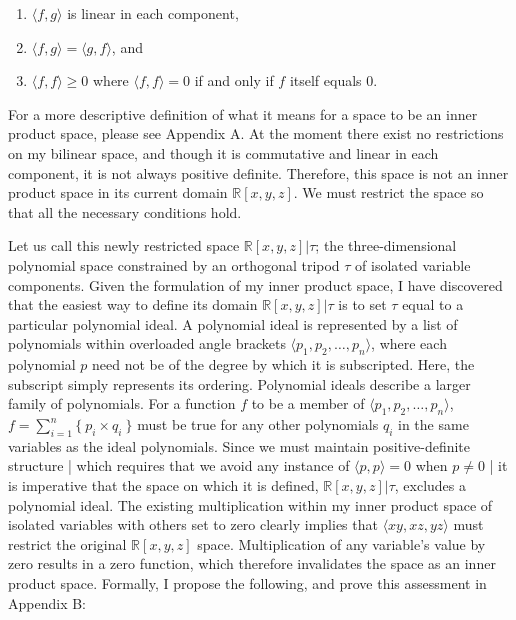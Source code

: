 \documentclass[letterpaper, 12pt]{article}
\begin{document}
\vspace*{2mm}
\begin{enumerate}
	\singlespacing
	\item $\langle f, g\rangle$ is linear in each component,
	\item $\langle f, g\rangle = \langle g, f\rangle$, and
	\item $\langle f, f\rangle \geq 0$ where $\langle f, f\rangle=0$ if and only if $f$ itself equals $0$.
\end{enumerate}

\doublespacing
\noindent For a more descriptive definition of what it means for a space to be an inner product space, please see Appendix A. At the moment there exist no restrictions on my bilinear space, and though it is commutative and linear in each component, it is not always positive definite. Therefore, this space is not an inner product space in its current domain $\mathbb{R} [x, y, z]$. We must restrict the space so that all the necessary conditions hold. 

Let us call this newly restricted space $\mathbb{R} [x, y, z] | \tau$; the three-dimensional polynomial space constrained by an orthogonal tripod $\tau$ of isolated variable components. Given the formulation of my inner product space, I have discovered that the easiest way to define its domain $\mathbb{R} [x, y, z] | \tau$ is to set $\tau$ equal to a particular polynomial ideal. A polynomial ideal is represented by a list of polynomials within overloaded angle brackets $\langle p_1, p_2, \ldots, p_n\rangle$, where each polynomial $p$ need not be of the degree by which it is subscripted. Here, the subscript simply represents its ordering. Polynomial ideals describe a larger family of polynomials. For a function $f$ to be a member of  $\langle p_1, p_2, \ldots, p_n\rangle$, $f = \sum_{i=1}^n\{ \ p_i\times q_i\ \}$ must be true for any other polynomials $q_i$ in the same variables as the ideal polynomials. Since we must maintain positive-definite structure | which requires that we avoid any instance of $\langle p, p\rangle=0$ when $p \neq 0$ | it is imperative that the space on which it is defined, $\mathbb{R} [x, y, z] | \tau$, excludes a polynomial ideal. The existing multiplication within my inner product space of isolated variables with others set to zero clearly implies that $\langle xy, xz, yz\rangle$ must restrict the original $\mathbb{R} [x, y, z]$ space. Multiplication of any variable's value by zero results in a zero function, which therefore invalidates the space as an inner product space. Formally, I propose the following, and prove this assessment in Appendix B:
\end{document}
